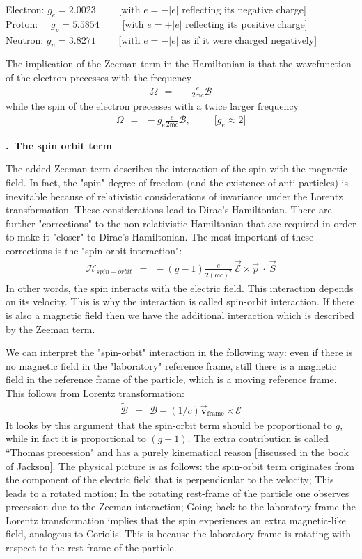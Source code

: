 \documentclass[onecolumn,fleqn, 11pt]{revtex4}
\newcommand{\mass}{\mathsf{m}}
\newcommand{\beq}{\begin{eqnarray}}
\newcommand{\eeq}{\end{eqnarray}}
\renewcommand{\thesubsection}{\arabic{subsection}}
\renewcommand{\thesubsubsection}{\arabic{subsubsection}}
\newcommand{\sheadC}[1]
{
\addtocounter{subsubsection}{1}
\vspace{5mm}
{\bf \thesubsection.\thesubsubsection \ #1}  
\nopagebreak
\phantomsection
}
\begin{document}
Electron: ${g_e = 2.0023 }$  \ \ \ \ [with $e=-|e|$ reflecting its negative charge] \\
Proton: \ \ ${g_p= 5.5854 }$  \ \ \ \ [with $e=+|e|$ reflecting its positive charge]  \\
Neutron: ${g_n= 3.8271 }$ \ \ \ \ [with $e=-|e|$ as if it were charged negatively] 

The implication of the Zeeman term in the Hamiltonian 
is that the wavefunction of the electron 
precesses with the frequency
\beq
\Omega \ \ = \ \ -\frac{e}{2\mass c}\mathcal{B} 
\eeq
while the spin of the electron precesses 
with a twice larger frequency
\beq
\Omega \ \ = \ \ -g_e\frac{e}{2\mass c}\mathcal{B}, 
\ \ \ \ \ \ \ \ \ \ \ \Big[g_e \approx 2\Big]
\eeq



\sheadC{The spin orbit term}

The added Zeeman term describes the interaction of the spin with the 
magnetic field. In fact, the "spin" degree of freedom 
(and the existence of anti-particles) is inevitable because 
of relativistic considerations of invariance under 
the Lorentz transformation. These considerations 
lead to Dirac's Hamiltonian. There are further "corrections" 
to the non-relativistic Hamiltonian that are required in order 
to make it "closer" to Dirac's Hamiltonian. 
The most important of these corrections is the "spin orbit interaction":
\beq
\mathcal{H}_{spin-orbit} 
\ \ = \ \ -(g{-}1)\frac{e}{2(\mass c)^2} \ \vec{\mathcal{E}} \times \vec{p} \ \cdot \ \vec{S} 
\eeq
In other words, the spin interacts with the 
electric field. This interaction depends on its  
velocity. This is why the interaction is called 
spin-orbit interaction. If there is also 
a magnetic field then we have the additional 
interaction which is described by the Zeeman term. 


We can interpret the "spin-orbit" interaction 
in the following way: even if there is 
no magnetic field in the "laboratory" reference 
frame, still there is a magnetic field 
in the reference frame of the particle, 
which is a moving reference frame.  
This follows from Lorentz transformation:
\beq
\tilde{\mathcal{B}}
\ \ = \ \ \mathcal{B} - (1/c)\vec{\mathbf{v}}_{\mbox{frame}} \times \mathcal{E}
\eeq
It looks by this argument that the spin-orbit term should be 
proportional to $g$, while in fact it is proportional to ${(g{-}1)}$.
The extra contribution is called ``Thomas precession" and has 
a purely kinematical reason [discussed in the book of Jackson]. 
The physical picture is as follows: the spin-orbit term originates 
from the component of the electric field that is perpendicular
to the velocity; This leads to a rotated motion; 
In the rotating rest-frame of the particle one observes
precession due to the Zeeman interaction; Going back to 
the laboratory frame the Lorentz transformation implies 
that the spin experiences an extra magnetic-like field, 
analogous to Coriolis. This is because the laboratory frame 
is rotating with respect to the rest frame of the particle.     
 
\end{document}
